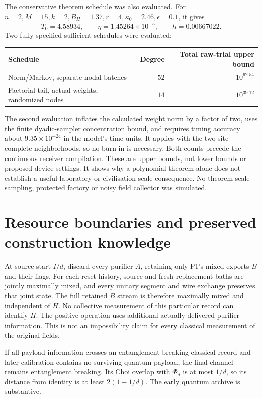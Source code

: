 \documentclass[11pt]{article}
\begin{document}
The conservative theorem schedule was also evaluated. For
\(n=2,M=15,k=2,B_H=1.37,r=4,\kappa_0=2.46,\epsilon=0.1\), it gives
\[
T_0=4.58934,\qquad \eta=1.45264\times10^{-5},\qquad h=0.00667022.
\]
Two fully specified sufficient schedules were evaluated:
\begin{center}
\begin{tabular}{lrr}
\toprule Schedule & Degree & Total raw-trial upper bound\\ \midrule
Norm/Markov, separate nodal batches & \(52\)& \(10^{62.54}\)\\
Factorial tail, actual weights, randomized nodes & \(14\)& \(10^{39.12}\)\\
\bottomrule
\end{tabular}
\end{center}
The second evaluation inflates the calculated weight norm by a factor of
two, uses the finite dyadic-sampler concentration bound, and requires
timing accuracy about \(9.35\times10^{-24}\) in the model's time units.
It applies with the two-site complete neighborhoods, so no burn-in
is necessary. Both counts precede the continuous receiver compilation.
These are upper bounds, not lower bounds or proposed device settings.
It shows why a polynomial theorem alone does not establish a useful
laboratory or civilisation-scale consequence. No theorem-scale sampling,
protected factory or noisy field collector was simulated.

\section{Resource boundaries and preserved construction knowledge}
At source start \(I/d\), discard every purifier \(A\), retaining only P1's
mixed exports \(B\) and their flags. For each reset history, source and
fresh replacement baths are jointly maximally mixed, and every unitary
segment and wire exchange preserves that joint state. The full retained
\(B\) stream is therefore maximally mixed and independent of \(H\).
No collective measurement of this particular record can identify \(H\).
The positive operation uses additional actually delivered purifier
information. This is not an impossibility claim for every classical
measurement of the original fields.

If all payload information crosses an entanglement-breaking classical
record and later calibration contains no surviving quantum payload,
the final channel remains entanglement breaking. Its Choi overlap with
\(\Phi_d\) is at most \(1/d\), so its distance from identity is at least
\(2(1-1/d)\). The early quantum archive is substantive.
\end{document}
